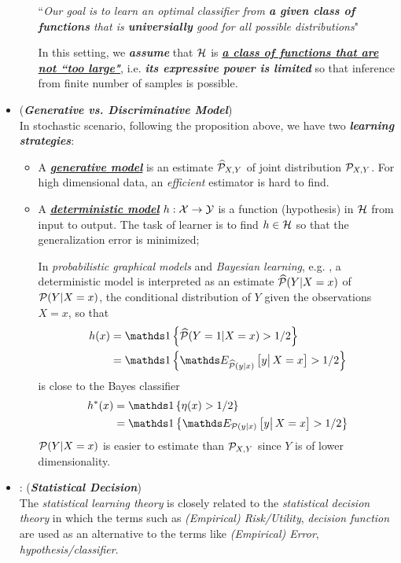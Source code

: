 \documentclass[11pt]{article}
\begin{document}
\begin{itemize}
\begin{remark}
\begin{enumerate}
``\emph{Our goal is to learn an optimal classifier from \textbf{a given class  of functions} that is \textbf{universially} good for all possible distributions}"

In this setting, we \emph{\textbf{assume}} that ${\mathcal H}$ is \emph{\underline{\textbf{a class of functions that are not ``too large"}}}, i.e. \emph{\textbf{its expressive power is limited}} so that inference from finite number of samples is possible. 
\end{enumerate}
\end{remark}

\item \begin{definition} (\emph{\textbf{Generative vs. Discriminative Model}})\\
In stochastic scenario, following the proposition above, we have two \emph{\textbf{learning strategies}}: 
\begin{itemize}
\item A \underline{\emph{\textbf{generative model}}} is an estimate $\widehat{{\mathcal P}}_{X,Y}$ of joint distribution ${\mathcal P}_{X,Y}$. For high dimensional data, an \emph{efficient} estimator is hard to find.

\item  A \underline{\emph{\textbf{deterministic model}}} $h: {\mathcal X} \rightarrow {\mathcal Y}$ is a function (hypothesis) in ${\mathcal H}$ from input to output. The task of learner is to find $h \in {\mathcal H}$ so that the generalization error is minimized; 

In \emph{probabilistic graphical models} and \emph{Bayesian learning}, e.g. \citep{koller2009probabilistic, murphy2012machine}, a deterministic model is interpreted as an estimate $\widehat{{\mathcal P}}(Y| X=x)$ of ${\mathcal P}(Y| X=x)$, the conditional distribution of $Y$ given the observations $X=x$, so that  
\begin{align*}
h(x) &= \ind{\widehat{\cP}(Y=1| X=x)>1/2}\\
&=  \ind{\E{\widehat{\cP}(y|x)}{y\big|\,X=x}>1/2}
\end{align*} is close to the Bayes classifier
\begin{align*}
h^{*}(x)&= \ind{\eta(x)>1/2}\\
&=\ind{\E{\cP(y|x)}{y\big|\,X=x}>1/2}
\end{align*} ${\mathcal P}(Y| X=x)$ is easier to estimate than ${\mathcal P}_{X,Y}$ since $Y$ is of lower dimensionality.
\end{itemize}
\end{definition}

\item \begin{remark}: (\emph{\textbf{Statistical Decision}}) \citep{berger2013statistical}\\
The \emph{statistical learning theory} is closely related to the \emph{statistical decision theory} in which the terms such as  \emph{(Empirical) Risk/Utility}, \emph{decision function} are used as an alternative to the terms like \emph{(Empirical) Error}, \emph{hypothesis/classifier}. 
\end{remark}
\end{itemize}





\newpage


\end{document}

